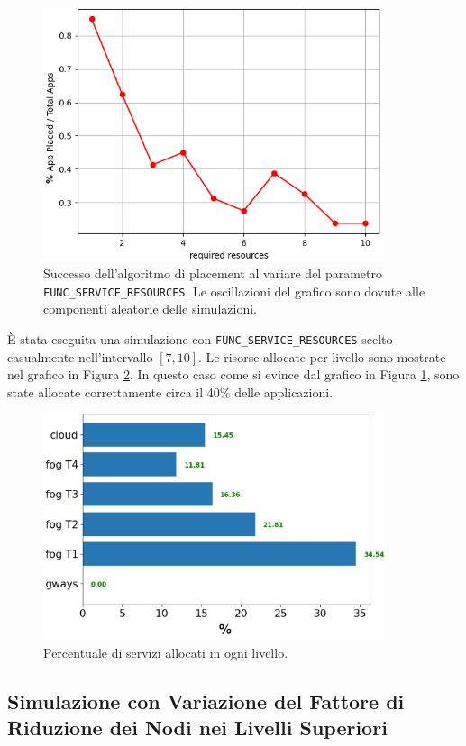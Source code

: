 \begin{figure}[!ht]
  \includegraphics[width=10cm]{images/resources_placement_success}
  \centering
  \caption{Successo dell'algoritmo di placement al variare del parametro \texttt{FUNC\_SERVICE\_RESOURCES}. Le oscillazioni del grafico sono dovute alle componenti aleatorie delle simulazioni.}
  \label{fig:resources_placement_success}
\end{figure}

È stata eseguita una simulazione con \texttt{FUNC\_SERVICE\_RESOURCES} scelto casualmente nell'intervallo $[7, 10]$. Le risorse allocate per livello sono mostrate nel grafico in Figura \ref{fig:resources_placement_per_level}. In questo caso come si evince dal grafico in Figura \ref{fig:resources_placement_success}, sono state allocate correttamente circa il 40\% delle applicazioni.

\begin{figure}[!ht]
  \includegraphics[width=10cm]{images/resources_placement_per_level}
  \centering
  \caption{Percentuale di servizi allocati in ogni livello.}
  \label{fig:resources_placement_per_level}
\end{figure}

\subsection{Simulazione con Variazione del Fattore di Riduzione dei Nodi nei Livelli Superiori}

